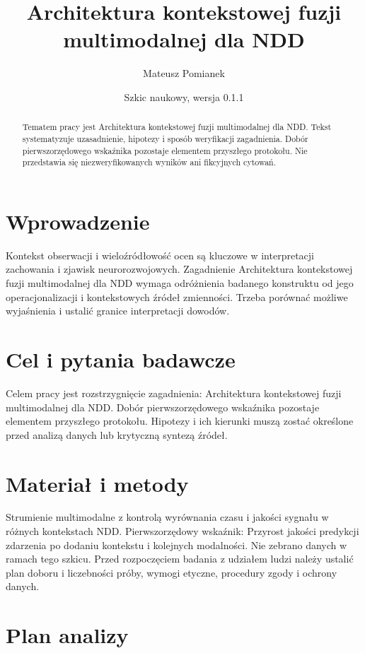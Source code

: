 \documentclass[11pt,a4paper]{article}
\title{Architektura kontekstowej fuzji multimodalnej dla NDD}
\author{Mateusz Pomianek}
\date{Szkic naukowy, wersja 0.1.1}
\begin{document}
\maketitle

\begin{abstract}

Tematem pracy jest Architektura kontekstowej fuzji multimodalnej dla NDD. Tekst systematyzuje uzasadnienie, hipotezy i sposób weryfikacji zagadnienia. Dobór pierwszorzędowego wskaźnika pozostaje elementem przyszłego protokołu. Nie przedstawia się niezweryfikowanych wyników ani fikcyjnych cytowań.

\end{abstract}

\section{Wprowadzenie}

Kontekst obserwacji i wieloźródłowość ocen są kluczowe w interpretacji zachowania i zjawisk neurorozwojowych. Zagadnienie Architektura kontekstowej fuzji multimodalnej dla NDD wymaga odróżnienia badanego konstruktu od jego operacjonalizacji i kontekstowych źródeł zmienności. Trzeba porównać możliwe wyjaśnienia i ustalić granice interpretacji dowodów.

\section{Cel i pytania badawcze}

Celem pracy jest rozstrzygnięcie zagadnienia: Architektura kontekstowej fuzji multimodalnej dla NDD. Dobór pierwszorzędowego wskaźnika pozostaje elementem przyszłego protokołu. Hipotezy i ich kierunki muszą zostać określone przed analizą danych lub krytyczną syntezą źródeł.

\section{Materiał i metody}

Strumienie multimodalne z kontrolą wyrównania czasu i jakości sygnału w różnych kontekstach NDD. Pierwszorzędowy wskaźnik: Przyrost jakości predykcji zdarzenia po dodaniu kontekstu i kolejnych modalności. Nie zebrano danych w ramach tego szkicu. Przed rozpoczęciem badania z udziałem ludzi należy ustalić plan doboru i liczebności próby, wymogi etyczne, procedury zgody i ochrony danych.

\section{Plan analizy}
\end{document}
